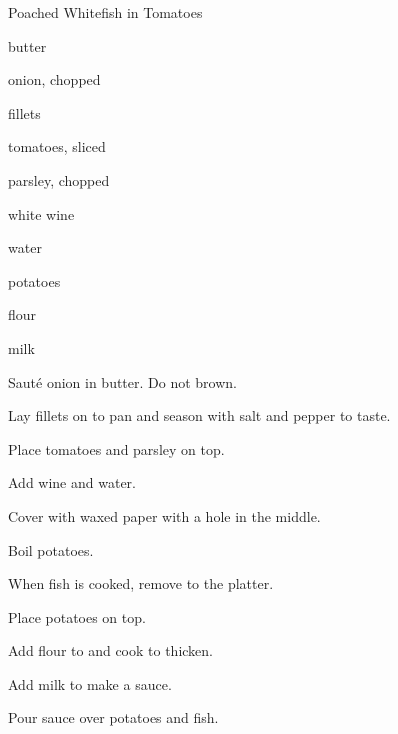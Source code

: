 \begin{recipe}{Poached Whitefish in Tomatoes}{}{}

\begin{ingredients}
\item {} butter
\item onion, chopped
\item {} fillets
\item tomatoes, sliced
\item parsley, chopped
\item \C{\half} white wine
\item \C{\half} water
\item potatoes
\item {} flour
\item \C{\half} milk
\end{ingredients}

\begin{directions}
\item Saut\'e onion in butter. Do not brown.
\item Lay fillets on to pan and season with salt and pepper to taste.
\item Place tomatoes and parsley on top.
\item Add wine and water.
\item Cover with waxed paper with a hole in the middle.
\item Boil potatoes.
\item When fish is cooked, remove to the platter.
\item Place potatoes on top.
\item Add flour to and cook to thicken.
\item Add milk to make a sauce.
\item Pour sauce over potatoes and fish.
\end{directions}

\end{recipe}

